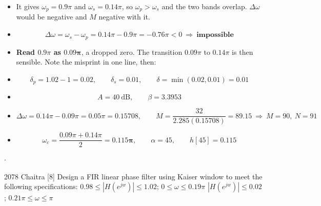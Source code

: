 \begin{itemize}
  \item {} It gives
        $\omega_p=0.9\pi$ and $\omega_s=0.14\pi$, so $\omega_p>\omega_s$ and the two
        bands overlap. $\Delta\omega$ would be negative and $M$ negative with it.
  \item[] \[ \Delta\omega=\omega_s-\omega_p=0.14\pi-0.9\pi=-0.76\pi<0
             \ \Rightarrow\ \textbf{impossible} \]
  \item \textbf{Read $0.9\pi$ as $\mathbf{0.09\pi}$}, a dropped zero. The transition
        $0.09\pi$ to $0.14\pi$ is then sensible. Note the misprint in one line, then:
  \item[] \[ \delta_p=1.02-1=0.02,\qquad \delta_s=0.01,\qquad
             \delta=\min(0.02,0.01)=0.01 \]
  \item[] \[ A=40\ \text{dB},\qquad \beta=3.3953 \]
  \item[] \[ \Delta\omega=0.14\pi-0.09\pi=0.05\pi=0.15708,\qquad
             M=\frac{32}{2.285(0.15708)}=89.15\ \Rightarrow\ M=90,\ \boxed{N=91} \]
  \item[] \[ \omega_c=\frac{0.09\pi+0.14\pi}{2}=\mathbf{0.115\pi},\qquad \alpha=45,
             \qquad h[45]=0.115 \]
\end{itemize}

{\color{sub}\footnotesize {} \gap$\cdot$\gap {}}

\begin{asked}{2078 Chaitra \textperiodcentered{} [8]}
Design a FIR linear phase filter using Kaiser window to meet the following
specifications:\newline
$0.98\le|H(e^{jw})|\le1.02$; \quad $0\le\omega\le0.19\pi$\newline
$|H(e^{jw})|\le0.02$; \quad $0.21\pi\le\omega\le\pi$
\end{asked}

